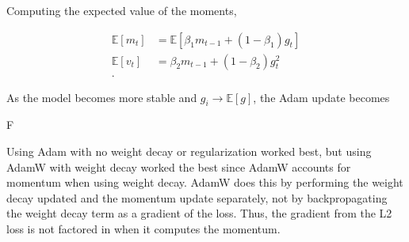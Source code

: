 \documentclass[answers]{exam}
\begin{document}
\begin{questions}
\begin{parts}
\begin{solution}
Computing the expected value of the moments,

\begin{align*}
    \mathbb{E}[m_{t}] &= \mathbb{E}[\beta_1 m_{t-1} + (1 - \beta_1)g_{t}] \\
\mathbb{E}[v_{t}] &= \beta_2 m_{t-1} + (1 - \beta_2)g_{t}^2 \\
.\end{align*}


As the model becomes more stable and $g_i \to \mathbb{E}[g]$, the Adam
update becomes

F

Using Adam with no weight decay or regularization worked best, but using AdamW
with weight decay worked the best since AdamW accounts for momentum when using
weight decay. AdamW does this by performing the weight decay updated and the 
momentum update separately, not by backpropagating the weight decay term as a
gradient of the loss. Thus, the gradient from the L2 loss is not factored in
when it computes the momentum.
\end{solution}


\end{parts}
\end{questions}
\end{document}
